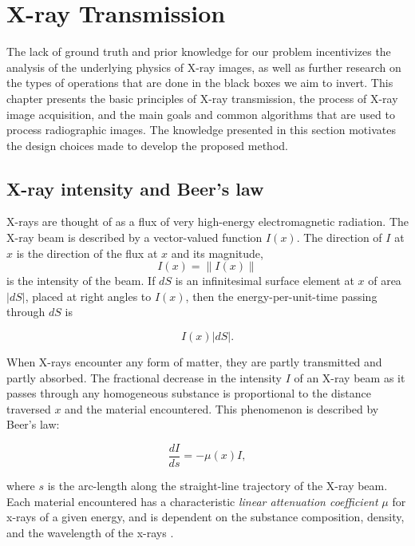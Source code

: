 \documentclass[nomenclature, english, bibtex]{kththesis}
\numberwithin{listing}{chapter}
\begin{document}
\chapter{X-ray Transmission}
\label{sec:xrayTransmissionModel}

The lack of ground truth and prior knowledge for our problem incentivizes the analysis of the underlying
physics of X-ray images, as well as further research on the types of operations that are done in the black boxes
we aim to invert. This chapter presents the basic principles of X-ray transmission, the process of X-ray image
acquisition, and the main goals and common algorithms that are used to process radiographic images. The
knowledge presented in this section motivates the design choices made to develop the proposed method.

\section{X-ray intensity and Beer's law}

X-rays are thought of as a flux of very high-energy electromagnetic radiation. The X-ray beam is
described by a vector-valued function $I(x)$. The direction of $I$ at $x$ is the direction of the flux at $x$ and
its magnitude,
\begin{equation}
    I (x) = \lVert I(x) \rVert
\end{equation}
is the intensity of the beam. If $dS$ is an infinitesimal surface element at $x$ of area
$|dS|$, placed at right angles to $I(x)$, then the energy-per-unit-time passing through $dS$ is \cite[p.~56]{epstein2008}

\begin{equation}
    I (x) |dS|.
\end{equation}

When X-rays encounter any form of matter, they are partly transmitted and partly absorbed.
The fractional decrease in the intensity $I$ of an X-ray beam as it passes
through any homogeneous substance is proportional to the distance traversed $x$
and the material encountered\cite[p.~11]{cullityElementsXrayDiffraction2014}.
This phenomenon is described by Beer's law:

\begin{equation}
    \frac{dI}{ds} = -\mu(x)I,
    \label{eq:BeerLambert}
\end{equation}

where $s$ is the arc-length along the straight-line trajectory of the X-ray beam.
Each material encountered has a characteristic \textit{linear attenuation coefficient} $\mu$ for x-rays of a
given energy, and is dependent on the substance composition, density, and the wavelength of the x-rays \cite[p.~57]{epstein2008}.
\end{document}
